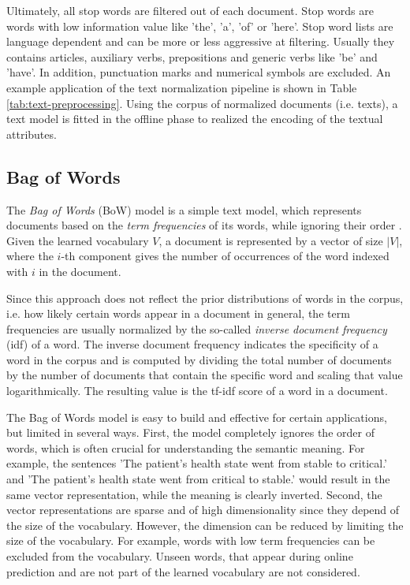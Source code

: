 Ultimately, all stop words are filtered out of each document.
Stop words are words with low information value like 'the', 'a', 'of' or 'here'.
Stop word lists are language dependent and can be more or less aggressive at filtering.
Usually they contains articles, auxiliary verbs, prepositions and generic verbs like 'be' and 'have'.
In addition, punctuation marks and numerical symbols are excluded.
An example application of the text normalization pipeline is shown in Table \ref{tab:text-preprocessing}.
Using the corpus of normalized documents (i.e. texts), a text model is fitted in the offline phase to realized the encoding of the textual attributes.

\subsection{Bag of Words}\label{sec:bow}

The \textit{Bag of Words} (BoW) model is a simple text model, which represents documents based on the \textit{term frequencies} of its words, while ignoring their order \cite{harris1954distributional}.
Given the learned vocabulary $V$, a document is represented by a vector of size $|V|$, where the $i$-th component gives the number of occurrences of the word indexed with $i$ in the document.

Since this approach does not reflect the prior distributions of words in the corpus, i.e. how likely certain words appear in a document in general, the term frequencies are usually normalized by the so-called \textit{inverse document frequency} (idf) of a word.
The inverse document frequency indicates the specificity of a word in the corpus and is computed by dividing the total number of documents by the number of documents that contain the specific word and scaling that value logarithmically.
The resulting value is the tf-idf score of a word in a document.

The Bag of Words model is easy to build and effective for certain applications, but limited in several ways.
First, the model completely ignores the order of words, which is often crucial for understanding the semantic meaning. For example, the sentences 'The patient's health state went from stable to critical.' and 'The patient's health state went from critical to stable.' would result in the same vector representation, while the meaning is clearly inverted.
Second, the vector representations are sparse and of high dimensionality since they depend of the size of the vocabulary.
However, the dimension can be reduced by limiting the size of the vocabulary. For example, words with low term frequencies can be excluded from the vocabulary.
Unseen words, that appear during online prediction and are not part of the learned vocabulary are not considered.

